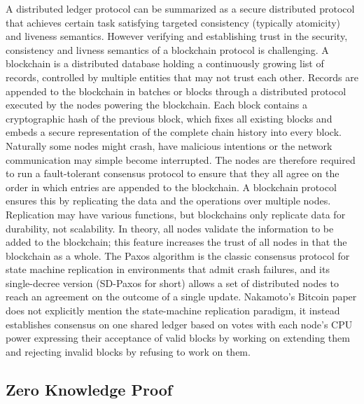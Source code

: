 \documentclass{article}
\begin{document}
A distributed ledger protocol can be summarized as a secure distributed protocol that achieves certain task satisfying targeted consistency (typically atomicity) and liveness semantics. However verifying and establishing trust in the security, consistency and livness semantics of a blockchain protocol is challenging. A blockchain is a distributed database holding a continuously growing list of records, controlled by multiple entities that may not trust each other. Records are appended to the blockchain in batches or blocks through a distributed protocol executed by the nodes powering the blockchain. Each block contains a cryptographic hash of the previous block, which fixes all existing blocks and embeds a secure representation of the complete chain history into every block. Naturally some nodes might crash, have malicious intentions or the network communication may simple become interrupted. The nodes are therefore required to run a fault-tolerant consensus protocol to ensure that they all agree on the order in which entries are appended to the blockchain. A blockchain protocol ensures this by replicating the data and the operations over multiple nodes. Replication may have various functions, but blockchains only replicate data for durability, not scalability. 
In theory, all nodes validate the information to be added to the blockchain; this feature increases the trust of all nodes in that the blockchain as a whole. The Paxos algorithm is the classic consensus protocol for state machine replication in environments that admit crash failures, and its single-decree version (SD-Paxos for short) allows a set of distributed nodes to reach an agreement on the outcome of a single update. Nakamoto's Bitcoin paper does not explicitly mention the state-machine replication paradigm, it instead establishes consensus on one shared ledger based on votes with each node's CPU power expressing their acceptance of valid blocks by working on extending them and rejecting invalid blocks by refusing to work on them.



\subsection{Zero Knowledge Proof}
\end{document}
